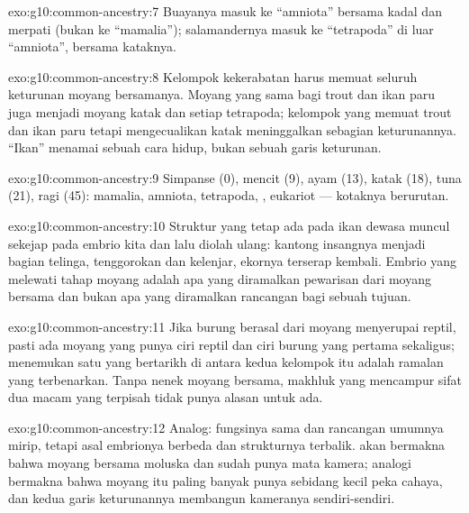 \begin{solution}{exo:g10:common-ancestry:7}
Buayanya masuk ke ``amniota'' bersama kadal dan merpati (bukan ke
``mamalia''); salamandernya masuk ke ``tetrapoda'' di luar
``amniota'', bersama kataknya.
\end{solution}

\begin{solution}{exo:g10:common-ancestry:8}
Kelompok kekerabatan harus memuat seluruh keturunan moyang bersamanya.
Moyang yang sama bagi trout dan ikan paru juga menjadi moyang katak dan
setiap tetrapoda; kelompok yang memuat trout dan ikan paru tetapi
mengecualikan katak meninggalkan sebagian keturunannya. ``Ikan''
menamai sebuah cara hidup, bukan sebuah garis keturunan.
\end{solution}

\begin{solution}{exo:g10:common-ancestry:9}
Simpanse (0), mencit (9), ayam (13), katak (18), tuna (21), ragi (45):
mamalia, amniota, tetrapoda, , eukariot --- kotaknya
berurutan.
\end{solution}

\begin{solution}{exo:g10:common-ancestry:10}
Struktur yang tetap ada pada ikan dewasa muncul sekejap pada embrio
kita dan lalu diolah ulang: kantong insangnya menjadi bagian telinga,
tenggorokan dan kelenjar, ekornya terserap kembali. Embrio yang
melewati tahap moyang adalah apa yang diramalkan pewarisan dari moyang
bersama dan bukan apa yang diramalkan rancangan bagi sebuah tujuan.
\end{solution}

\begin{solution}{exo:g10:common-ancestry:11}
Jika burung berasal dari moyang menyerupai reptil, pasti ada moyang
yang punya ciri reptil dan ciri burung yang pertama sekaligus;
menemukan satu yang bertarikh di antara kedua kelompok itu adalah
ramalan yang terbenarkan. Tanpa nenek moyang bersama, makhluk yang
mencampur sifat dua macam yang terpisah tidak punya alasan untuk ada.
\end{solution}

\begin{solution}{exo:g10:common-ancestry:12}
Analog: fungsinya sama dan rancangan umumnya mirip, tetapi asal
embrionya berbeda dan strukturnya terbalik.  akan bermakna
bahwa moyang bersama moluska dan  sudah punya mata kamera;
analogi bermakna bahwa moyang itu paling banyak punya sebidang kecil
peka cahaya, dan kedua garis keturunannya membangun kameranya sendiri-sendiri.
\end{solution}

